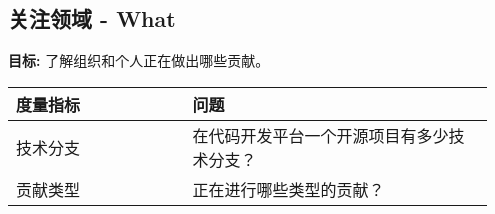 
    \subsection{关注领域 - What}
    \textbf{目标:} 了解组织和个人正在做出哪些贡献。
    \begin{table}[ht!]
        \centering
        \begin{tabular}{|p{0.35\linewidth} | p{0.6\linewidth}|}
            \hline
            \hfil \textbf{度量指标}  & \hfil \textbf{问题} \\
            \hline
        		技术分支 & 在代码开发平台一个开源项目有多少技术分支？ \\ 
		\hline
		贡献类型 & 正在进行哪些类型的贡献？ \\ 
		\hline
    \end{tabular}
    \end{table}
        
 
 

